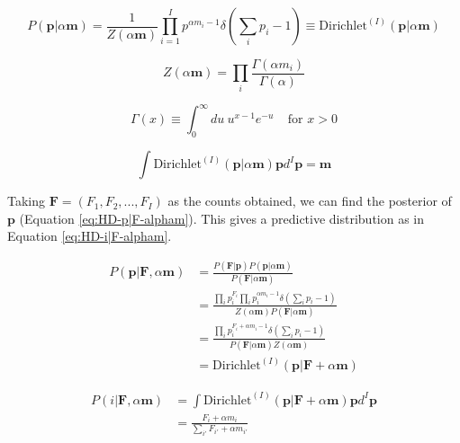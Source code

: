 \begin{equation}
P(\boldsymbol{p}|\alpha\boldsymbol{m})=\frac{1}{Z(\alpha\boldsymbol{m})}\prod_{i=1}^{I}p^{\alpha m_{i}-1}\delta(\sum_{i}p_{i}-1)\equiv \text{Dirichlet}^{(I)}(\boldsymbol{p}|\alpha\boldsymbol{m})
\label{eq:HD-Dir-p|alpha-m}
\end{equation}

\begin{equation}
Z(\alpha\boldsymbol{m})=\prod_{i}\frac{\Gamma(\alpha m_{i})}{\Gamma(\alpha)}
\label{eq:HD-Z}
\end{equation}

\begin{equation}
\Gamma(x)\equiv\int_{0}^{\infty}du\ u^{x-1}e^{-u} \ \ \ \ \ \text{for }x>0
\label{eq:HD-Gamma}
\end{equation}

\begin{equation}
\int\text{Dirichlet}^{(I)}(\boldsymbol{p}|\alpha\boldsymbol{m})\boldsymbol{p}d^{I}\boldsymbol{p}=\boldsymbol{m}
\label{eq:HD-DirMean}
\end{equation}

Taking $\boldsymbol{F}=(F_{1},F_{2},...,F_{I})$ as the counts obtained, we can find the posterior of $\boldsymbol{p}$ (Equation \ref{eq:HD-p|F-alpham}). This gives a predictive distribution as in Equation \ref{eq:HD-i|F-alpham}.

\begin{align}
P(\boldsymbol{p}|\boldsymbol{F},\alpha\boldsymbol{m})&=\frac{P(\boldsymbol{F}|\boldsymbol{p})P(\boldsymbol{p}|\alpha\boldsymbol{m})}{P(\boldsymbol{F}|\alpha\boldsymbol{m})} \nonumber
\\
&=\frac{\prod_{i}p_{i}^{F_{i}}\prod_{i}p_{i}^{\alpha m_{i}-1}\delta(\sum_{i}p_{i}-1)}{Z(\alpha\boldsymbol{m})P(\boldsymbol{F}|\alpha\boldsymbol{m})} \nonumber
\\
&=\frac{\prod_{i}p_{i}^{F_{i}+\alpha m_{i}-1}\delta(\sum_{i}p_{i}-1)}{P(\boldsymbol{F}|\alpha\boldsymbol{m})Z(\alpha\boldsymbol{m})} \nonumber
\\
&=\text{Dirichlet}^{(I)}(\boldsymbol{p}|\boldsymbol{F}+\alpha\boldsymbol{m})
\label{eq:HD-p|F-alpham}
\end{align}

\begin{align}
P(i|\boldsymbol{F},\alpha\boldsymbol{m})&=\int\text{Dirichlet}^{(I)}(\boldsymbol{p}|\boldsymbol{F}+\alpha\boldsymbol{m})\boldsymbol{p}d^{I}\boldsymbol{p} \nonumber
\\
&=\frac{F_{i}+\alpha m_{i}}{\sum_{i'}F_{i'}+\alpha m_{i'}}
\label{eq:HD-i|F-alpham}
\end{align}

